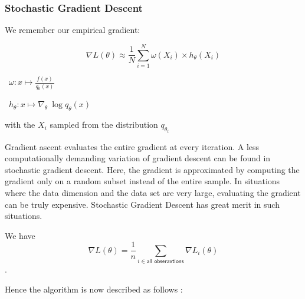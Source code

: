 \pagebreak

\subsubsection{Stochastic Gradient Descent}
	We remember our empirical gradient:

	$$\nabla L(\theta) \approx \frac 1 N \displaystyle\sum_{i = 1}^N \omega(X_i) \times h_\theta(X_i)$$

	\faAngleRight \ $\omega : x \mapsto \frac{f(x)}{q_0(x)}$

	\faAngleRight \ $h_\theta : x \mapsto \nabla_\theta \ \log q_\theta(x)$

	\bigskip

	with the $X_i$ sampled from the distribution $q_{\theta_t}$

	\bigskip

	Gradient ascent evaluates the entire gradient at every iteration. A less computationally demanding variation of gradient descent can be found in stochastic gradient descent. Here, the gradient is approximated by computing the gradient only on a random subset instead of the entire sample. In situations where the data dimension and the data set are very large, evaluating the gradient can be truly expensive. Stochastic Gradient Descent has great merit in such situations.

	\bigskip

	We have
	$$\nabla L(\theta) = \frac 1 n \sum_{i \in \textsf{all obseravtions}} \nabla L_i(\theta)$$.

	\bigskip

	Hence the algorithm is now described as follows :

